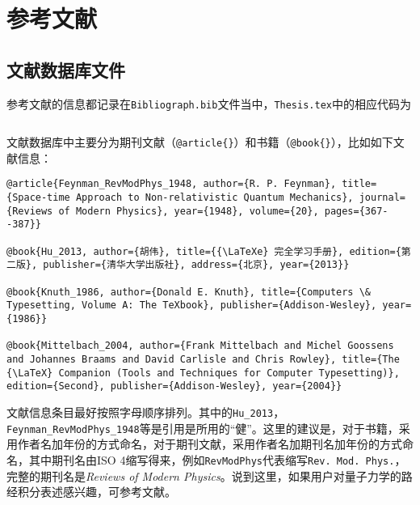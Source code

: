 \section{参考文献}



\subsection{文献数据库文件}
\par 参考文献的信息都记录在\texttt{Bibliograph.bib}文件当中，\texttt{Thesis.tex}中的相应代码为
\begin{lstlisting}[language=TeX]

\end{lstlisting}
文献数据库中主要分为期刊文献（\verb"@article{}"）和书籍（\verb"@book{}"），比如如下文献信息：
\begin{lstlisting}
@article{Feynman_RevModPhys_1948, author={R. P. Feynman}, title={Space-time Approach to Non-relativistic Quantum Mechanics}, journal={Reviews of Modern Physics}, year={1948}, volume={20}, pages={367--387}}

@book{Hu_2013, author={胡伟}, title={{\LaTeXe} 完全学习手册}, edition={第二版}, publisher={清华大学出版社}, address={北京}, year={2013}}

@book{Knuth_1986, author={Donald E. Knuth}, title={Computers \& Typesetting, Volume A: The TeXbook}, publisher={Addison-Wesley}, year={1986}}

@book{Mittelbach_2004, author={Frank Mittelbach and Michel Goossens and Johannes Braams and David Carlisle and Chris Rowley}, title={The {\LaTeX} Companion (Tools and Techniques for Computer Typesetting)}, edition={Second}, publisher={Addison-Wesley}, year={2004}}
\end{lstlisting}
文献信息条目最好按照字母顺序排列。其中的\texttt{Hu\_2013}，\texttt{Feynman\_RevModPhys\_1948}等是引用是所用的“健”。这里的建议是，对于书籍，采用作者名加年份的方式命名，对于期刊文献，采用作者名加期刊名加年份的方式命名，其中期刊名由ISO 4缩写得来，例如\texttt{RevModPhys}代表缩写\texttt{Rev. Mod. Phys.}，完整的期刊名是\textit{Reviews of Modern Physics}。说到这里，如果用户对量子力学的路经积分表述感兴趣，可参考文献\cite{Feynman_RevModPhys_1948}。



